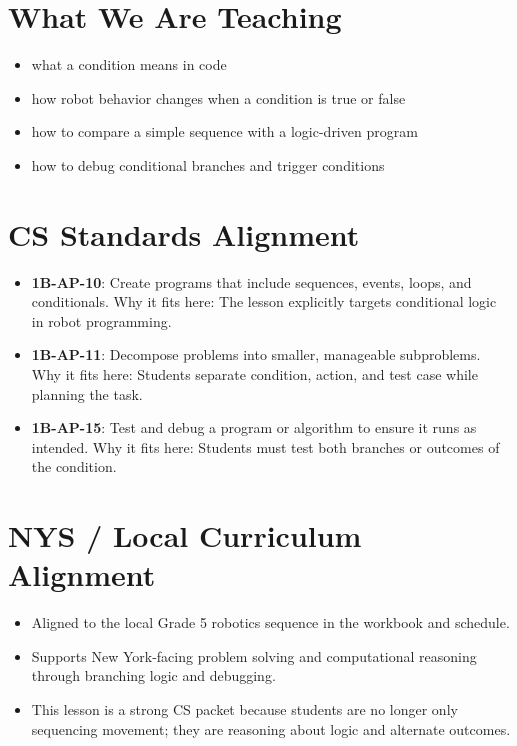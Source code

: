 \documentclass[11pt]{article}
\begin{document}
\section*{What We Are Teaching}
\begin{itemize}[leftmargin=*]
\item what a condition means in code
\item how robot behavior changes when a condition is true or false
\item how to compare a simple sequence with a logic-driven program
\item how to debug conditional branches and trigger conditions
\end{itemize}

\section*{CS Standards Alignment}
\begin{itemize}[leftmargin=*]
\item \textbf{1B-AP-10}: Create programs that include sequences, events, loops, and conditionals. Why it fits here: The lesson explicitly targets conditional logic in robot programming.
\item \textbf{1B-AP-11}: Decompose problems into smaller, manageable subproblems. Why it fits here: Students separate condition, action, and test case while planning the task.
\item \textbf{1B-AP-15}: Test and debug a program or algorithm to ensure it runs as intended. Why it fits here: Students must test both branches or outcomes of the condition.
\end{itemize}

\section*{NYS / Local Curriculum Alignment}
\begin{itemize}[leftmargin=*]
\item Aligned to the local Grade 5 robotics sequence in the workbook and schedule.
\item Supports New York-facing problem solving and computational reasoning through branching logic and debugging.
\item This lesson is a strong CS packet because students are no longer only sequencing movement; they are reasoning about logic and alternate outcomes.
\end{itemize}
\end{document}
